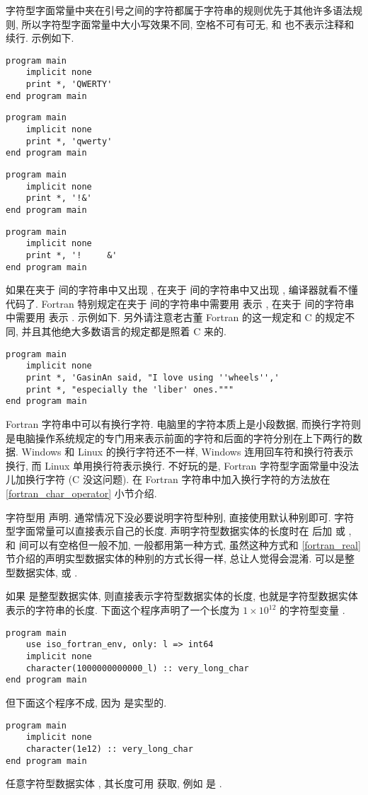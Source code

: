 字符型字面常量中夹在引号之间的字符都属于字符串的规则优先于其他许多语法规则, 所以字符型字面常量中大小写效果不同, 空格不可有可无, \ttt{!} 和 \ttt{\&{}} 也不表示注释和续行. 示例如下.
\begin{lstlisting}
program main
    implicit none
    print *, 'QWERTY'
end program main
\end{lstlisting}
\begin{lstlisting}
program main
    implicit none
    print *, 'qwerty'
end program main
\end{lstlisting}
\begin{lstlisting}
program main
    implicit none
    print *, '!&' 
end program main
\end{lstlisting}
\begin{lstlisting}
program main
    implicit none
    print *, '!     &' 
end program main
\end{lstlisting}

如果在夹于  间的字符串中又出现 , 在夹于  间的字符串中又出现 , 编译器就看不懂代码了. Fortran 特别规定在夹于  间的字符串中需要用  表示 , 在夹于  间的字符串中需要用  表示 . 示例如下. 另外请注意老古董 Fortran 的这一规定和 C 的规定不同, 并且其他绝大多数语言的规定都是照着 C 来的.
\begin{lstlisting}
program main
    implicit none
    print *, 'GasinAn said, "I love using ''wheels'','
    print *, "especially the 'liber' ones."""
end program main
\end{lstlisting}

Fortran 字符串中可以有换行字符. 电脑里的字符本质上是小段数据, 而换行字符则是电脑操作系统规定的专门用来表示前面的字符和后面的字符分别在上下两行的数据. Windows 和 Linux 的换行字符还不一样, Windows 连用回车符和换行符表示换行, 而 Linux 单用换行符表示换行. 不好玩的是, Fortran 字符型字面常量中没法儿加换行字符 (C 没这问题). 在 Fortran 字符串中加入换行字符的方法放在 \ref{fortran_char_operator} 小节介绍.

字符型用  声明. 通常情况下没必要说明字符型种别, 直接使用默认种别即可. 字符型字面常量可以直接表示自己的长度. 声明字符型数据实体的长度时在  后加 \ttt{([len])} 或 , 和  间可以有空格但一般不加, 一般都用第一种方式, 虽然这种方式和 \ref{fortran_real} 节介绍的声明实型数据实体的种别的方式长得一样, 总让人觉得会混淆. \ttt{[len]} 可以是整型数据实体, \ttt{*} 或 \ttt{:}.

如果 \ttt{[len]} 是整型数据实体, 则直接表示字符型数据实体的长度, 也就是字符型数据实体表示的字符串的长度. 下面这个程序声明了一个长度为 $1\times 10^{12}$ 的字符型变量 .
\begin{lstlisting}
program main
    use iso_fortran_env, only: l => int64
    implicit none
    character(1000000000000_l) :: very_long_char
end program main
\end{lstlisting}
但下面这个程序不成, 因为  是实型的.
\begin{lstlisting}
program main
    implicit none
    character(1e12) :: very_long_char
end program main
\end{lstlisting}
任意字符型数据实体 \ttt{[c]}, 其长度可用  获取, 例如  是 .

